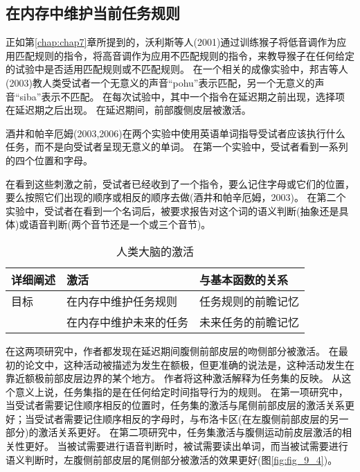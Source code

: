 \subsection{在内存中维护当前任务规则}
\par

正如第\ref{chap:chap7}章所提到的，沃利斯等人(2001)通过训练猴子将低音调作为应用匹配规则的指令，将高音调作为应用不匹配规则的指令，来教导猴子在任何给定的试验中是否适用匹配规则或不匹配规则。
在一个相关的成像实验中，邦吉等人(2003)教人类受试者一个无意义的声音“pohu”表示匹配，另一个无意义的声音“siba”表示不匹配。
在每次试验中，其中一个指令在延迟期之前出现，选择项在延迟期之后出现。
在延迟期间，前部腹侧皮层被激活。
\par


酒井和帕辛厄姆(2003,2006)在两个实验中使用英语单词指导受试者应该执行什么任务，而不是向受试者呈现无意义的单词。
在第一个实验中，受试者看到一系列的四个位置和字母。
\par


在看到这些刺激之前，受试者已经收到了一个指令，要么记住字母或它们的位置，要么按照它们出现的顺序或相反的顺序去做(酒井和帕辛厄姆，2003)。
在第二个实验中，受试者在看到一个名词后，被要求报告对这个词的语义判断(抽象还是具体)或语音判断(两个音节还是一个或三个音节)。


\begin{table}[htbp] 
	\newcommand{\tabincell}[2]{\begin{tabular}{@{}#1@{}}#2\end{tabular}} %
	\centering
	\caption{人类大脑的激活\label{tab:9_3}}
	\renewcommand\arraystretch{1.5}	%
	\begin{tabular}{lll}
		\toprule
		详细阐述 & 激活 & 与基本函数的关系\\
		\midrule
		目标 & 在内存中维护任务规则 & 任务规则的前瞻记忆  \\
		& 在内存中维护未来的任务 & 未来任务的前瞻记忆 \\
		\bottomrule
		
	\end{tabular}%
\end{table}%
\par


在这两项研究中，作者都发现在延迟期间腹侧前部皮层的吻侧部分被激活。
在最初的论文中，这种活动被描述为发生在额极，但更准确的说法是，这种活动发生在靠近额极前部皮层边界的某个地方。
作者将这种激活解释为任务集的反映。
从这个意义上说，任务集指的是在任何给定时间指导行为的规则。
在第一项研究中，当受试者需要记住顺序相反的位置时，任务集的激活与尾侧前部皮层的激活关系更好；当受试者需要记住顺序相反的字母时，与布洛卡区(在左腹侧前部皮层的另一部分)的激活关系更好。
在第二项研究中，任务集激活与腹侧运动前皮层激活的相关性更好。
当被试需要进行语音判断时，被试需要读出单词，而当被试需要进行语义判断时，左腹侧前部皮层的尾侧部分被激活的效果更好(图\ref{fig:fig_9_4})。


